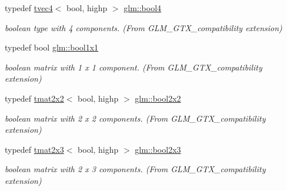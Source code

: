 \begin{DoxyCompactItemize}
\mbox{\label{group__gtx__compatibility_ga141861edebf999f94938944f0fb0777a}} 
typedef \hyperlink{structglm_1_1tvec4}{tvec4}$<$ bool, highp $>$ \hyperlink{group__gtx__compatibility_ga141861edebf999f94938944f0fb0777a}{glm\+::bool4}
\begin{DoxyCompactList}\small\item\em boolean type with 4 components. (From G\+L\+M\+\_\+\+G\+T\+X\+\_\+compatibility extension) \end{DoxyCompactList}\item 
\mbox{\label{group__gtx__compatibility_ga98d9d3da22aebc872ba38ce5afa0eff7}} 
typedef bool \hyperlink{group__gtx__compatibility_ga98d9d3da22aebc872ba38ce5afa0eff7}{glm\+::bool1x1}
\begin{DoxyCompactList}\small\item\em boolean matrix with 1 x 1 component. (From G\+L\+M\+\_\+\+G\+T\+X\+\_\+compatibility extension) \end{DoxyCompactList}\item 
\mbox{\label{group__gtx__compatibility_gaeb49db4b236907ba11f5b9117274b5d8}} 
typedef \hyperlink{structglm_1_1tmat2x2}{tmat2x2}$<$ bool, highp $>$ \hyperlink{group__gtx__compatibility_gaeb49db4b236907ba11f5b9117274b5d8}{glm\+::bool2x2}
\begin{DoxyCompactList}\small\item\em boolean matrix with 2 x 2 components. (From G\+L\+M\+\_\+\+G\+T\+X\+\_\+compatibility extension) \end{DoxyCompactList}\item 
\mbox{\label{group__gtx__compatibility_ga2d7e2c79179868a41d1f9f7a63f2ae52}} 
typedef \hyperlink{structglm_1_1tmat2x3}{tmat2x3}$<$ bool, highp $>$ \hyperlink{group__gtx__compatibility_ga2d7e2c79179868a41d1f9f7a63f2ae52}{glm\+::bool2x3}
\begin{DoxyCompactList}\small\item\em boolean matrix with 2 x 3 components. (From G\+L\+M\+\_\+\+G\+T\+X\+\_\+compatibility extension) \end{DoxyCompactList}\item 
\mbox{\label{group__gtx__compatibility_gacbd1c62dfad23155dba803d7c5125288}} 

\end{DoxyCompactItemize}

